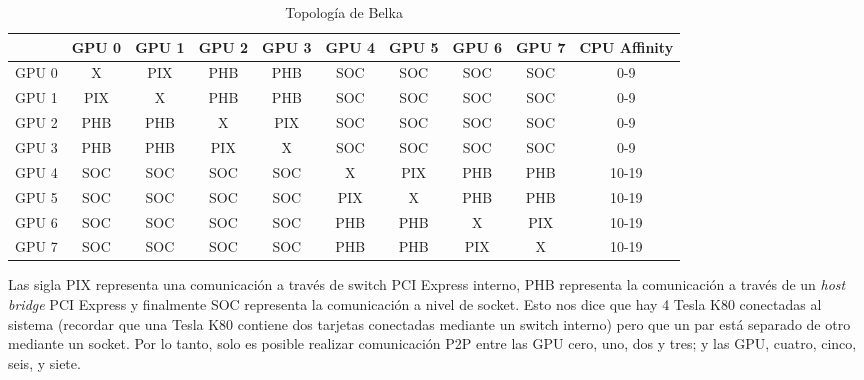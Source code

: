 \begin{table}[h!]
	\centering
	\begin{tabular}{@{}cccccccccc@{}}
		\toprule
		      & GPU 0 & GPU 1 & GPU 2 & GPU 3 & GPU 4 & GPU 5 & GPU 6 & GPU 7 & CPU Affinity \\ \midrule
		GPU 0 & X     & PIX   & PHB   & PHB   & SOC   & SOC   & SOC   & SOC   & 0-9          \\
		GPU 1 & PIX   & X     & PHB   & PHB   & SOC   & SOC   & SOC   & SOC   & 0-9          \\
		GPU 2 & PHB   & PHB   & X     & PIX   & SOC   & SOC   & SOC   & SOC   & 0-9          \\
		GPU 3 & PHB   & PHB   & PIX   & X     & SOC   & SOC   & SOC   & SOC   & 0-9          \\
		GPU 4 & SOC   & SOC   & SOC   & SOC   & X     & PIX   & PHB   & PHB   & 10-19        \\
		GPU 5 & SOC   & SOC   & SOC   & SOC   & PIX   & X     & PHB   & PHB   & 10-19        \\
		GPU 6 & SOC   & SOC   & SOC   & SOC   & PHB   & PHB   & X     & PIX   & 10-19        \\
		GPU 7 & SOC   & SOC   & SOC   & SOC   & PHB   & PHB   & PIX   & X     & 10-19        \\ \bottomrule
	\end{tabular}
	\caption{Topología de Belka}
	\label{tab:topology}
\end{table}

Las sigla PIX representa una comunicación a través de switch PCI Express interno, PHB representa la comunicación a través de un \textit{host bridge} PCI Express y finalmente SOC representa la comunicación a nivel de socket. Esto nos dice que hay 4 Tesla K80 conectadas al sistema (recordar que una Tesla K80 contiene dos tarjetas conectadas mediante un switch interno) pero que un par está separado de otro mediante un socket. Por lo tanto, solo es posible realizar comunicación P2P entre las GPU cero, uno, dos y tres; y las GPU, cuatro, cinco, seis, y siete.

